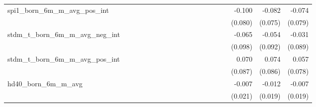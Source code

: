 \begin{tabular}{lrrrrrrrrrrrrrrrrrr}
spi1\_born\_6m\_m\_avg\_pos\_int            &             &             &             &             &             &             &             &             &             &             &             &             &             &             &             &      -0.100 &      -0.082 &      -0.074 \\ 
                                            &             &             &             &             &             &             &             &             &             &             &             &             &             &             &             &     (0.080) &     (0.075) &     (0.079) \\ 
stdm\_t\_born\_6m\_m\_avg\_neg\_int         &             &             &             &             &             &             &             &             &             &             &             &             &             &             &             &      -0.065 &      -0.054 &      -0.031 \\ 
                                            &             &             &             &             &             &             &             &             &             &             &             &             &             &             &             &     (0.098) &     (0.092) &     (0.089) \\ 
stdm\_t\_born\_6m\_m\_avg\_pos\_int         &             &             &             &             &             &             &             &             &             &             &             &             &             &             &             &       0.070 &       0.074 &       0.057 \\ 
                                            &             &             &             &             &             &             &             &             &             &             &             &             &             &             &             &     (0.087) &     (0.086) &     (0.078) \\ 
hd40\_born\_6m\_m\_avg                      &             &             &             &             &             &             &             &             &             &             &             &             &             &             &             &      -0.007 &      -0.012 &      -0.007 \\ 
                                            &             &             &             &             &             &             &             &             &             &             &             &             &             &             &             &     (0.021) &     (0.019) &     (0.019) \\ 

\end{tabular}
